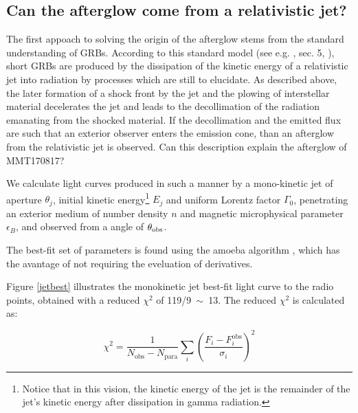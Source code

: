 \subsection{Can the afterglow come from a relativistic jet?}
The first appoach to solving the origin of the afterglow stems from the standard understanding of GRBs. According to this standard model (see e.g. \cite{27}, \cite{26} sec. 5, \cite{28}), short GRBs are produced by the dissipation of the kinetic energy of a relativistic jet into radiation by processes which are still to elucidate. As described above, the later formation of a shock front by the jet and the plowing of interstellar material decelerates the jet and leads to the decollimation of the radiation emanating from the shocked material. If the decollimation and the emitted flux are such that an exterior observer enters the emission cone, than an afterglow from the relativistic jet is observed. Can this description explain the afterglow of MMT170817?


We calculate light curves produced in such a manner by a mono-kinetic jet of aperture $\theta_j$, initial kinetic energy\footnote{Notice that in this vision, the kinetic energy of the jet is the remainder of the jet's kinetic energy after dissipation in gamma radiation.} $E_j$ and uniform Lorentz factor $\Gamma_0$, penetrating an exterior medium of number density $n$ and magnetic microphysical parameter $\epsilon_B$, and observed from a angle of $\theta_{\rm{obs}}$.

The best-fit set of parameters is found using the amoeba algorithm \cite{20}, which has the avantage of not requiring the eveluation of derivatives.


Figure \ref{jetbest} illustrates the monokinetic jet best-fit light curve to the radio points, obtained with a reduced $\chi^2$ of 119/9~$\sim$~13. The reduced $\chi^2$ is calculated as:

\begin{equation}
    \chi^2 = \frac{1}{N_\text{obs} - N_\text{para}} \sum_i\left( \frac{F_i - F_i^\text{obs}}{\sigma_i} \right)^2
\end{equation}

